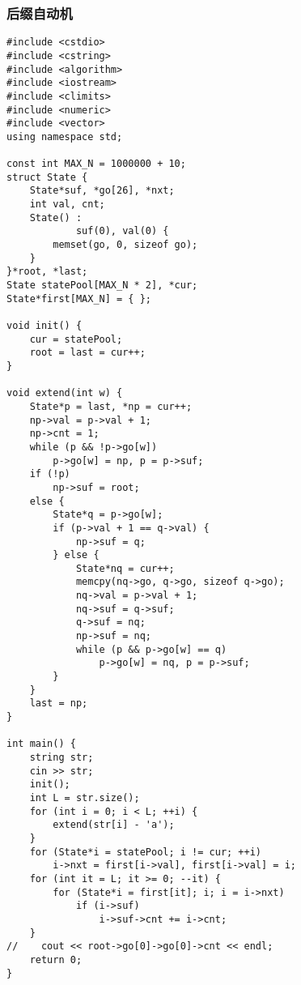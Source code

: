 \subsubsection{后缀自动机}
\begin{verbatim}
#include <cstdio>
#include <cstring>
#include <algorithm>
#include <iostream>
#include <climits>
#include <numeric>
#include <vector>
using namespace std;

const int MAX_N = 1000000 + 10;
struct State {
    State*suf, *go[26], *nxt;
    int val, cnt;
    State() :
            suf(0), val(0) {
        memset(go, 0, sizeof go);
    }
}*root, *last;
State statePool[MAX_N * 2], *cur;
State*first[MAX_N] = { };

void init() {
    cur = statePool;
    root = last = cur++;
}

void extend(int w) {
    State*p = last, *np = cur++;
    np->val = p->val + 1;
    np->cnt = 1;
    while (p && !p->go[w])
        p->go[w] = np, p = p->suf;
    if (!p)
        np->suf = root;
    else {
        State*q = p->go[w];
        if (p->val + 1 == q->val) {
            np->suf = q;
        } else {
            State*nq = cur++;
            memcpy(nq->go, q->go, sizeof q->go);
            nq->val = p->val + 1;
            nq->suf = q->suf;
            q->suf = nq;
            np->suf = nq;
            while (p && p->go[w] == q)
                p->go[w] = nq, p = p->suf;
        }
    }
    last = np;
}

int main() {
    string str;
    cin >> str;
    init();
    int L = str.size();
    for (int i = 0; i < L; ++i) {
        extend(str[i] - 'a');
    }
    for (State*i = statePool; i != cur; ++i)
        i->nxt = first[i->val], first[i->val] = i;
    for (int it = L; it >= 0; --it) {
        for (State*i = first[it]; i; i = i->nxt)
            if (i->suf)
                i->suf->cnt += i->cnt;
    }
//    cout << root->go[0]->go[0]->cnt << endl;
    return 0;
}
\end{verbatim}

